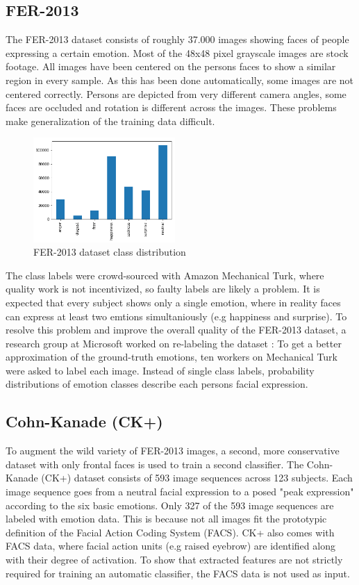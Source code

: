 \documentclass[twoside]{article}
\begin{document}
\begin{multicols}{2}
\subsection{FER-2013}
The FER-2013 dataset consists of roughly 37.000 images showing faces of people expressing a certain emotion. Most of the 48x48 pixel grayscale images are stock footage. All images have been centered on the persons faces to show a similar region in every sample. As this has been done automatically, some images are not centered correctly. Persons are depicted from very different camera angles, some faces are occluded and rotation is different across the images. These problems make generalization of the training data difficult. 

\begin{figure}[H]
	\includegraphics[width=0.48\textwidth]{ferplus_distribution}
	\caption{FER-2013 dataset class distribution}
\end{figure}

The class labels were crowd-sourced with Amazon Mechanical Turk, where quality work is not incentivized, so faulty labels are likely a problem. It is expected that every subject shows only a single emotion, where in reality faces can express at least two emtions simultaniously (e.g happiness and surprise). To resolve this problem and improve the overall quality of the FER-2013 dataset, a research group at Microsoft worked on re-labeling the dataset \cite{barsoum16}: To get a better approximation of the ground-truth emotions, ten workers on Mechanical Turk were asked to label each image. Instead of single class labels, probability distributions of emotion classes describe each persons facial expression.

\subsection{Cohn-Kanade (CK+)}
To augment the wild variety of FER-2013 images, a second, more conservative dataset with only frontal faces is used to train a second classifier. The Cohn-Kanade (CK+) dataset consists of 593 image sequences across 123 subjects. Each image sequence goes from a neutral facial expression to a posed "peak expression" according to the six basic emotions. Only 327 of the 593 image sequences are labeled with emotion data. This is because not all images fit the prototypic definition of the Facial Action Coding System (FACS). CK+ also comes with FACS data, where facial action units (e.g raised eyebrow) are identified along with their degree of activation. To show that extracted features are not strictly required for training an automatic classifier, the FACS data is not used as input.


\end{multicols}
\end{document}
